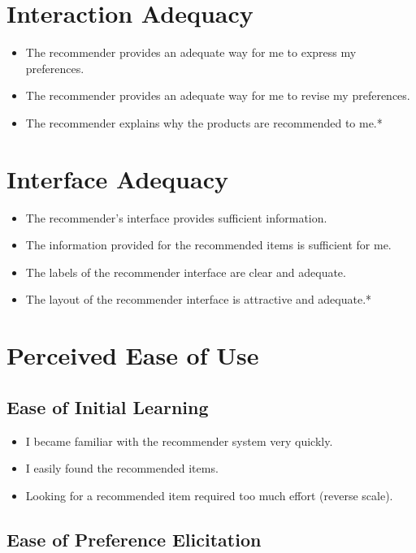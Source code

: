 \section{Interaction Adequacy}

\begin{itemize}
\item The recommender provides an adequate way for me to express my preferences.
\item The recommender provides an adequate way for me to revise my preferences.
\item The recommender explains why the products are recommended to me.*
\end{itemize}

\section{Interface Adequacy}

\begin{itemize}
\item The recommender’s interface provides sufficient information.
\item The information provided for the recommended items is sufficient for me.
\item The labels of the recommender interface are clear and adequate.
\item The layout of the recommender interface is attractive and adequate.*
\end{itemize}

\section{Perceived Ease of Use}

\subsection{Ease of Initial Learning}

\begin{itemize}
\item I became familiar with the recommender system very quickly.
\item I easily found the recommended items.
\item Looking for a recommended item required too much effort (reverse scale).
\end{itemize}

\subsection{Ease of Preference Elicitation}

